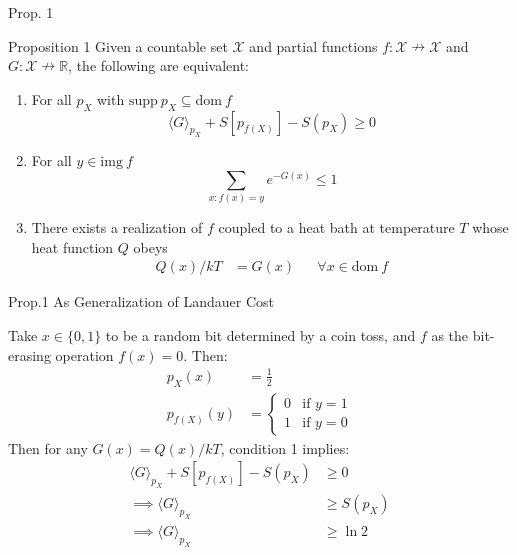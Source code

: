 \documentclass{beamer}
\begin{document}
\begin{frame}{Prop. 1}

\begin{block}{Proposition 1}
Given a countable set $\mathcal{X}$ and partial functions $f:\mathcal{X} \nrightarrow \mathcal{X}$ and $G:\mathcal{X} \nrightarrow \mathbb{R}$, the following are equivalent:
\begin{enumerate}
    \item For all $p_X$ with $\text{supp}\: p_X \subseteq \text{dom}\: f$
    \begin{equation*}
        \langle G \rangle_{p_X} + S[p_{f(X)}] - S(p_X) \ge 0
    \end{equation*}
    \item For all $y\in \text{img}\: f$
    \begin{equation*}
        \sum_{x:f(x) = y} e^{-G(x)} \le 1
    \end{equation*}
    \item There exists a realization of $f$ coupled to a heat bath at temperature $T$ whose heat function $Q$ obeys
    \begin{align*}
        Q(x)/kT &= G(x)  &&\forall x\in\text{dom}\:f
    \end{align*}
\end{enumerate}
\end{block}
\end{frame}


\begin{frame}{Prop.1 As Generalization of Landauer Cost}

Take $x\in\{0,1\}$ to be a random bit determined by a coin toss, and $f$ as the bit-erasing operation $f(x) = 0$. Then:
\begin{align*}
    p_X(x) &= \frac{1}{2}\\
    p_{f(X)}(y) &= \begin{cases} 0 &\text{if } y=1\\ 1 &\text{if }y=0\end{cases}
\end{align*}
Then for any $G(x) = Q(x)/kT$, condition 1 implies:
\begin{align*}
    \langle G \rangle_{p_X} + S[p_{f(X)}] - S(p_X) &\ge 0\\
    \implies \langle G\rangle_{p_X} &\ge S(p_X)\\
    \implies \langle G\rangle_{p_X} &\ge \ln 2
\end{align*}
\end{frame}
\end{document}
